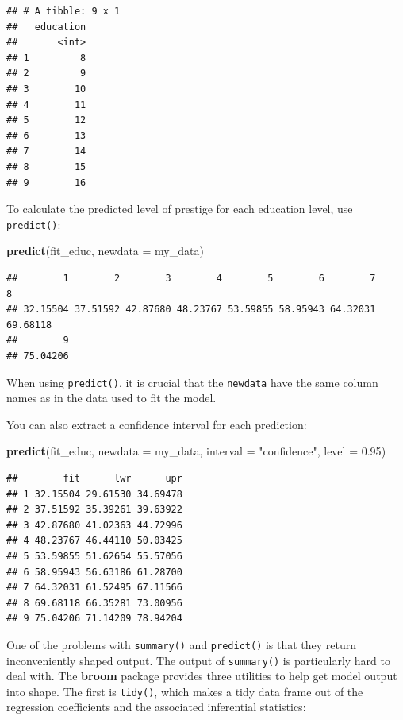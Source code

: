 \documentclass[12pt,oneside,openany]{book}
\newenvironment{Shaded}{\begin{snugshade}}{\end{snugshade}}
\newcommand{\KeywordTok}[1]{\textcolor[rgb]{0.13,0.29,0.53}{\textbf{#1}}}
\newcommand{\DataTypeTok}[1]{\textcolor[rgb]{0.13,0.29,0.53}{#1}}
\newcommand{\FloatTok}[1]{\textcolor[rgb]{0.00,0.00,0.81}{#1}}
\newcommand{\StringTok}[1]{\textcolor[rgb]{0.31,0.60,0.02}{#1}}
\newcommand{\NormalTok}[1]{#1}
\begin{document}
\begin{verbatim}
## # A tibble: 9 x 1
##   education
##       <int>
## 1         8
## 2         9
## 3        10
## 4        11
## 5        12
## 6        13
## 7        14
## 8        15
## 9        16
\end{verbatim}

To calculate the predicted level of prestige for each education level,
use \texttt{predict()}:

\begin{Shaded}
\begin{Highlighting}[]
\KeywordTok{predict}\NormalTok{(fit_educ, }\DataTypeTok{newdata =}\NormalTok{ my_data)}
\end{Highlighting}
\end{Shaded}

\begin{verbatim}
##        1        2        3        4        5        6        7        8 
## 32.15504 37.51592 42.87680 48.23767 53.59855 58.95943 64.32031 69.68118 
##        9 
## 75.04206
\end{verbatim}

When using \texttt{predict()}, it is crucial that the \texttt{newdata}
have the same column names as in the data used to fit the model.

You can also extract a confidence interval for each prediction:

\begin{Shaded}
\begin{Highlighting}[]
\KeywordTok{predict}\NormalTok{(fit_educ,}
        \DataTypeTok{newdata =}\NormalTok{ my_data,}
        \DataTypeTok{interval =} \StringTok{"confidence"}\NormalTok{,}
        \DataTypeTok{level =} \FloatTok{0.95}\NormalTok{)}
\end{Highlighting}
\end{Shaded}

\begin{verbatim}
##        fit      lwr      upr
## 1 32.15504 29.61530 34.69478
## 2 37.51592 35.39261 39.63922
## 3 42.87680 41.02363 44.72996
## 4 48.23767 46.44110 50.03425
## 5 53.59855 51.62654 55.57056
## 6 58.95943 56.63186 61.28700
## 7 64.32031 61.52495 67.11566
## 8 69.68118 66.35281 73.00956
## 9 75.04206 71.14209 78.94204
\end{verbatim}

One of the problems with \texttt{summary()} and \texttt{predict()} is
that they return inconveniently shaped output. The output of
\texttt{summary()} is particularly hard to deal with. The \textbf{broom}
package provides three utilities to help get model output into shape.
The first is \texttt{tidy()}, which makes a tidy data frame out of the
regression coefficients and the associated inferential statistics:
\end{document}
